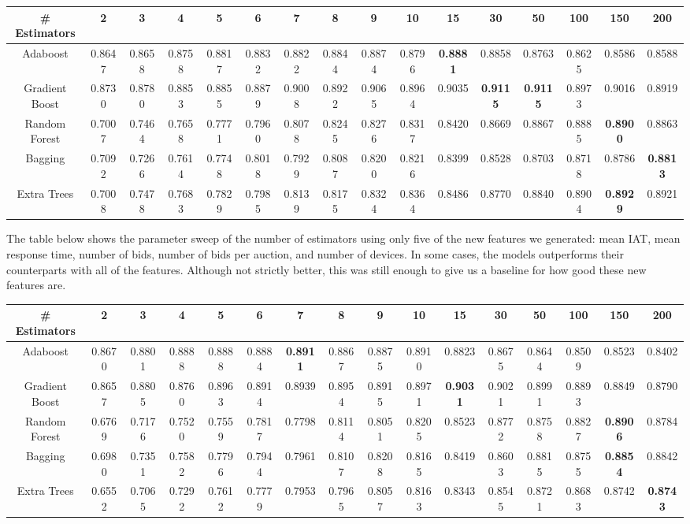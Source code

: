 \documentclass{article} %
\begin{document}
\begin{adjustbox}{width=\textwidth,totalheight=\textheight,keepaspectratio}
\begin{tabular}{c | c c c c c c c c c c c c c c c}
\# Estimators & 2 & 3 & 4 & 5 & 6 & 7 & 8 & 9 & 10 & 15 & 30 & 50 & 100 & 150 & 200\\
\hline
Adaboost & 0.8647 & 0.8658 & 0.8758 & 0.8817 & 0.8832 & 0.8822 & 0.8844 & 0.8874 & 0.8796 & \textbf{0.8881} & 0.8858 & 0.8763 & 0.8625 & 0.8586 & 0.8588\\
Gradient Boost & 0.8730 & 0.8780 & 0.8853 & 0.8855 & 0.8879 & 0.9008 & 0.8922 & 0.9065 & 0.8964 & 0.9035 & \textbf{0.9115} & \textbf{0.9115} & 0.8973 & 0.9016 & 0.8919\\
Random Forest & 0.7007 & 0.7464 & 0.7658 & 0.7771 & 0.7960 & 0.8078 & 0.8245 & 0.8276 & 0.8317 & 0.8420 & 0.8669 & 0.8867 & 0.8885 & \textbf{0.8900} & 0.8863\\
Bagging & 0.7092 & 0.7266 & 0.7614 & 0.7748 & 0.8018 & 0.7929 & 0.8087 & 0.8200 & 0.8216 & 0.8399 & 0.8528 & 0.8703 & 0.8718 & 0.8786 & \textbf{0.8813}\\
Extra Trees & 0.7008 & 0.7478 & 0.7683 & 0.7829 & 0.7985 & 0.8139 & 0.8175 & 0.8324 & 0.8364 & 0.8486 & 0.8770 & 0.8840 & 0.8904 & \textbf{0.8929} & 0.8921
\end{tabular}
\end{adjustbox}


The table below shows the parameter sweep of the number of estimators using only five
of the new features we generated: mean IAT, mean response time, number of bids,
number of bids per auction, and number of devices. In some cases, the models
outperforms their counterparts with all of the features. Although not strictly
better, this was still enough to give us a baseline for how good these new features are.

\begin{adjustbox}{width=\textwidth,totalheight=\textheight,keepaspectratio}
\begin{tabular}{c | c c c c c c c c c c c c c c c}
\# Estimators & 2 & 3 & 4 & 5 & 6 & 7 & 8 & 9 & 10 & 15 & 30 & 50 & 100 & 150 & 200\\
\hline
Adaboost & 0.8670 & 0.8801 & 0.8888 & 0.8888 & 0.8884 & \textbf{0.8911} & 0.8867 & 0.8875 & 0.8910 & 0.8823 & 0.8675 & 0.8644 & 0.8509 & 0.8523 & 0.8402\\
Gradient Boost & 0.8657 & 0.8805 & 0.8760 & 0.8963 & 0.8914 & 0.8939 & 0.8954 & 0.8915 & 0.8971 & \textbf{0.9031} & 0.9021 & 0.8991 & 0.8893 & 0.8849 & 0.8790\\
Random Forest & 0.6769 & 0.7176 & 0.7520 & 0.7559 & 0.7817 & 0.7798 & 0.8114 & 0.8051 & 0.8205 & 0.8523 & 0.8772 & 0.8758 & 0.8827 & \textbf{0.8906} & 0.8784\\
Bagging & 0.6980 & 0.7351 & 0.7582 & 0.7796 & 0.7944 & 0.7961 & 0.8107 & 0.8208 & 0.8165 & 0.8419 & 0.8603 & 0.8815 & 0.8755 & \textbf{0.8854} & 0.8842\\
Extra Trees & 0.6552 & 0.7065 & 0.7292 & 0.7612 & 0.7779 & 0.7953 & 0.7965 & 0.8057 & 0.8163 & 0.8343 & 0.8545 & 0.8721 & 0.8683 & 0.8742 & \textbf{0.8743}
\end{tabular}
\end{adjustbox}
\end{document}
